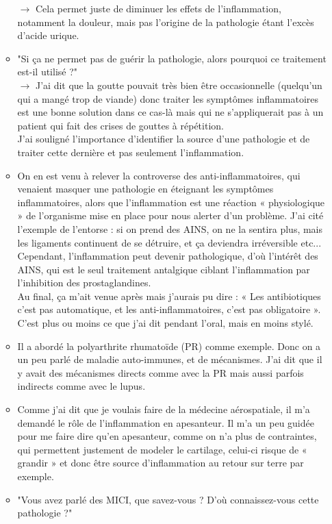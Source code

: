 \begin{enumerate}[label=\blacksquare]
\begin{itemize}
        $\longrightarrow$ Cela permet juste de diminuer les effets de l’inflammation, notamment la douleur, mais pas l’origine de la pathologie étant l’excès d’acide urique.
        \item "Si ça ne permet pas de guérir la pathologie, alors pourquoi ce traitement est-il utilisé ?" \\
        $\longrightarrow$ J’ai dit que la goutte pouvait très bien être occasionnelle (quelqu'un qui a mangé trop de viande) donc traiter les symptômes inflammatoires est une bonne solution dans ce cas-là mais qui ne s’appliquerait pas à un patient qui fait des crises de gouttes à répétition.\\
        J’ai souligné l’importance d’identifier la source d’une pathologie et de traiter cette dernière et pas seulement l’inflammation.
        \item On en est venu à relever la controverse des anti-inflammatoires, qui venaient masquer une pathologie en éteignant les symptômes inflammatoires, alors que l’inflammation est une réaction « physiologique » de l’organisme mise en place pour nous alerter d’un problème. J’ai cité l’exemple de l’entorse : si on prend des AINS, on ne la sentira plus, mais les ligaments continuent de se détruire, et ça deviendra irréversible etc...\\
        Cependant, l’inflammation peut devenir pathologique, d’où l’intérêt des AINS, qui est le seul traitement antalgique ciblant l’inflammation par l’inhibition des prostaglandines. \\
        Au final, ça m’ait venue après mais j’aurais pu dire : « Les antibiotiques c’est pas automatique, et les anti-inflammatoires, c’est pas obligatoire ». C’est plus ou moins ce que j’ai dit pendant l’oral, mais en moins stylé.
        \item Il a abordé la polyarthrite rhumatoïde (PR) comme exemple. Donc on a un peu parlé de maladie auto-immunes, et de mécanismes. J’ai dit que il y avait des mécanismes directs comme avec la PR mais aussi parfois indirects comme avec le lupus.
        \item Comme j’ai dit que je voulais faire de la médecine aérospatiale, il m’a demandé le rôle de l’inflammation en apesanteur. Il m’a un peu guidée pour me faire dire qu’en apesanteur, comme on n’a plus de contraintes, qui permettent justement de modeler le cartilage, celui-ci risque de « grandir » et donc être source d’inflammation au retour sur terre par exemple.
        \item "Vous avez parlé des MICI, que savez-vous ? D’où connaissez-vous cette pathologie ?"\\

\end{itemize}
\end{enumerate}
